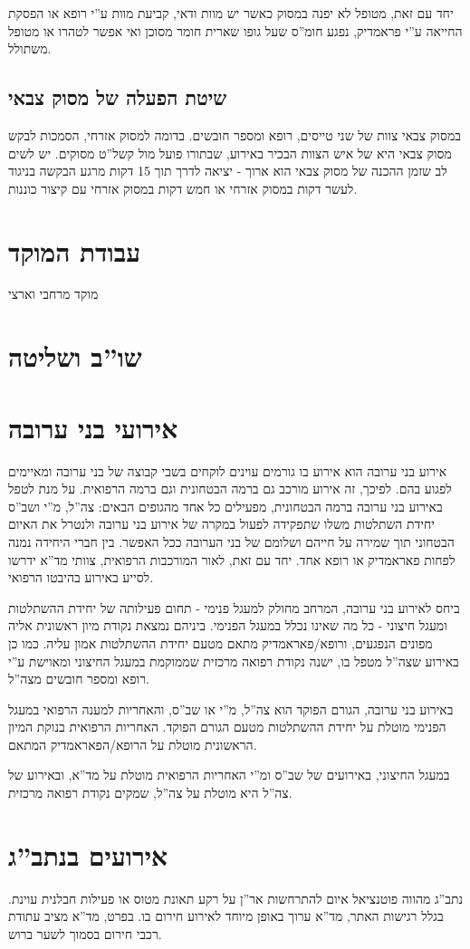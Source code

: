 \documentclass{article}
\begin{document}
יחד עם זאת, מטופל לא יפנה במסוק כאשר יש מוות ודאי, קביעת מוות ע''י רופא או הפסקת החייאה ע''י פראמדיק, נפגע חומ''ס שעל גופו שארית חומר מסוכן ואי אפשר לטהרו או מטופל משתולל.
\subsection{שיטת הפעלה של מסוק צבאי}
במסוק צבאי צוות של שני טייסים, רופא ומספר חובשים. בדומה למסוק אזרחי, הסמכות לבקש מסוק צבאי היא של איש הצוות הבכיר באירוע, שבתורו פועל מול קשל''ט מסוקים. יש לשים לב שזמן ההכנה של מסוק צבאי הוא ארוך - יציאה לדרך תוך 15 דקות מרגע הבקשה בניגוד לעשר דקות במסוק אזרחי או חמש דקות במסוק אזרחי עם קיצור כוננות.
\section{עבודת המוקד}
מוקד מרחבי וארצי
\section{שו''ב ושליטה}
\section{אירועי בני ערובה}
אירוע בני ערובה הוא אירוע בו גורמים עוינים לוקחים בשבי קבוצה של בני ערובה ומאיימים לפגוע בהם. לפיכך, זה אירוע מורכב גם ברמה הבטחונית וגם ברמה הרפואית. על מנת לטפל באירוע בני ערובה ברמה הבטחונית, מפעילים כל אחד מהגופים הבאים: צה''ל, מ''י ושב''ס יחידת השתלטות משלו שתפקידה לפעול במקרה של אירוע בני ערובה ולנטרל את האיום הבטחוני תוך שמירה על חייהם ושלומם של בני הערובה ככל האפשר. בין חברי היחידה נמנה לפחות פאראמדיק או רופא אחד. יחד עם זאת, לאור המורכבות הרפואית, צוותי מד''א ידרשו
לסייע באירוע בהיבטו הרפואי.

ביחס לאירוע בני ערובה, המרחב מחולק למעגל פנימי - תחום פעילותה של יחידת ההשתלטות ומעגל חיצוני - כל מה שאינו נכלל במעגל הפנימי. ביניהם נמצאת נקודת מיון ראשונית אליה מפונים הנפגעים, ורופא/פאראמדיק מתאם מטעם יחידת ההשתלטות אמון עליה. כמו כן באירוע שצה''ל מטפל בו, ישנה נקודת רפואה מרכזית שממוקמת במעגל החיצוני ומאוישת ע''י רופא ומספר חובשים מצה''ל.

באירוע בני ערובה, הגורם הפוקד הוא צה''ל, מ''י או שב''ס, והאחריות למענה הרפואי במעגל הפנימי מוטלת על יחידת ההשתלטות מטעם הגורם הפוקד. האחריות הרפואית בנוקת המיון הראשונית מוטלת על הרופא/הפאראמדיק המתאם.

במעגל החיצוני, באירועים של שב''ס ומ''י האחריות הרפואית מוטלת על מד''א, ובאירוע של צה''ל היא מוטלת על צה''ל, שמקים נקודת רפואה מרכזית.


\section{אירועים בנתב''ג}
נתב''ג מהווה פוטנציאל איום להתרחשות אר''ן על רקע תאונת מטוס או פעילות חבלנית עוינת. בגלל רגישות האתר, מד''א ערוך באופן מיוחד לאירוע חירום בו. בפרט, מד''א מציב עתודת רכבי חירום בסמוך לשער ברוש.
\end{document}
